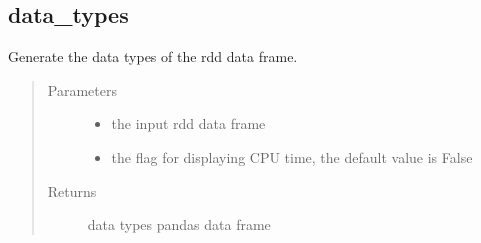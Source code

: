\documentclass[letterpaper,12pt,english]{sphinxmanual}
\begin{document}
\subsection{data\_types}
\label{\detokenize{basics:data-types}}

\begin{fulllineitems}
Generate the data types of the rdd data frame.
\begin{quote}\begin{description}
\item[{Parameters}] \leavevmode\begin{itemize}
\item {} 
 \textendash{} the input rdd data frame

\item {} 
 \textendash{} the flag for displaying CPU time, the default value is False

\end{itemize}

\item[{Returns}] \leavevmode
data types pandas data frame

\end{description}\end{quote}


\end{fulllineitems}
\end{document}
